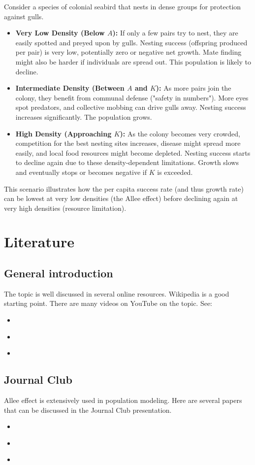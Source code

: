 \documentclass{article}
\begin{document}
Consider a species of colonial seabird that nests in dense groups for protection against gulls.
\begin{itemize}
    \item \textbf{Very Low Density (Below $A$):} If only a few pairs try to nest, they are easily spotted and preyed upon by gulls. Nesting success (offspring produced per pair) is very low, potentially zero or negative net growth. Mate finding might also be harder if individuals are spread out. This population is likely to decline.
    \item \textbf{Intermediate Density (Between $A$ and $K$):} As more pairs join the colony, they benefit from communal defense ("safety in numbers"). More eyes spot predators, and collective mobbing can drive gulls away. Nesting success increases significantly. The population grows.
    \item \textbf{High Density (Approaching $K$):} As the colony becomes very crowded, competition for the best nesting sites increases, disease might spread more easily, and local food resources might become depleted. Nesting success starts to decline again due to these density-dependent limitations. Growth slows and eventually stops or becomes negative if $K$ is exceeded.
\end{itemize}
This scenario illustrates how the per capita success rate (and thus growth rate) can be lowest at very low densities (the Allee effect) before declining again at very high densities (resource limitation).

\section{Literature}
\subsection{General introduction}
The topic is well discussed in several online resources. Wikipedia is a good starting point. There are many videos on YouTube on the topic. See:
\begin{itemize}
    \item \textcite{WikiAlleeEffect2025}
    \item \textcite{Drake2011_allee}
    \item \textcite{Kramer2017}
\end{itemize}
\subsection{Journal Club}
Allee effect is extensively used in population modeling. Here are several papers that can be discussed in the Journal Club presentation.
\begin{itemize}
    \item \textcite{Mumby2024_allee} 
    \item \textcite{Fadai2020_allee}
    \item \textcite{Tobin2011_allee}
\end{itemize}
\end{document}
